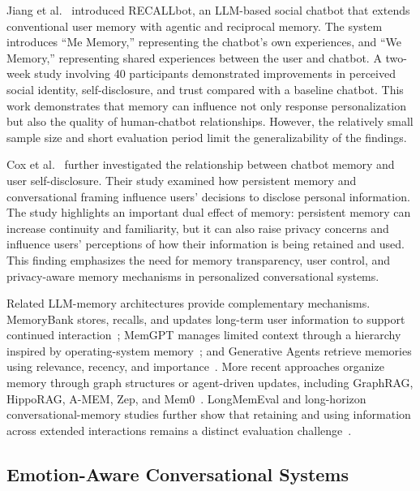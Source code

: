 \documentclass[graybox]{svmult}
\begin{document}
Jiang et al.~\cite{Jiang2026} introduced RECALLbot, an LLM-based social chatbot that extends conventional user memory with agentic and reciprocal memory. The system introduces ``Me Memory,'' representing the chatbot's own experiences, and ``We Memory,'' representing shared experiences between the user and chatbot. A two-week study involving 40 participants demonstrated improvements in perceived social identity, self-disclosure, and trust compared with a baseline chatbot. This work demonstrates that memory can influence not only response personalization but also the quality of human-chatbot relationships. However, the relatively small sample size and short evaluation period limit the generalizability of the findings.

Cox et al.~\cite{Cox2026} further investigated the relationship between chatbot memory and user self-disclosure. Their study examined how persistent memory and conversational framing influence users' decisions to disclose personal information. The study highlights an important dual effect of memory: persistent memory can increase continuity and familiarity, but it can also raise privacy concerns and influence users' perceptions of how their information is being retained and used. This finding emphasizes the need for memory transparency, user control, and privacy-aware memory mechanisms in personalized conversational systems.

Related LLM-memory architectures provide complementary mechanisms. MemoryBank stores, recalls, and updates long-term user information to support continued interaction~\cite{zhong2024memorybank}; MemGPT manages limited context through a hierarchy inspired by operating-system memory~\cite{packer2023memgpt}; and Generative Agents retrieve memories using relevance, recency, and importance~\cite{park2023generative}. More recent approaches organize memory through graph structures or agent-driven updates, including GraphRAG, HippoRAG, A-MEM, Zep, and Mem0~\cite{edge2024graphrag,gutierrez2024hipporag,xu2025amem,rasmussen2025zep,chhikara2025mem0}. LongMemEval and long-horizon conversational-memory studies further show that retaining and using information across extended interactions remains a distinct evaluation challenge~\cite{wu2025longmemeval,maharana2024longterm}.

\subsection{Emotion-Aware Conversational Systems}
\end{document}
